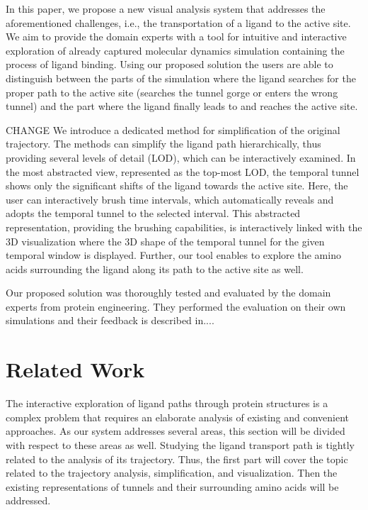 \documentclass[twocolumn]{bmcart}%
\begin{document}
In this paper, we propose a new visual analysis system that addresses the aforementioned challenges, i.e.,  the transportation of a ligand to the active site. 
We aim to provide the domain experts with a tool for intuitive and interactive exploration of already captured molecular dynamics simulation containing the process of ligand binding. 
Using our proposed solution the users are able to distinguish between the parts of the simulation where the ligand searches for the proper path to the active site (searches the tunnel gorge or enters the wrong tunnel) and the part where the ligand finally leads to and reaches the active site.

{\color{red} CHANGE
We introduce a dedicated method for simplification of the original trajectory.
The methods can simplify the ligand path hierarchically, thus providing several levels of detail (LOD), which can be interactively examined.
In the most abstracted view, represented as the top-most LOD, the temporal tunnel shows only the significant shifts of the ligand towards the active site. 
Here, the user can interactively brush time intervals, which automatically reveals and adopts the temporal tunnel to the selected interval.
This abstracted representation, providing the brushing capabilities, is interactively linked with the 3D visualization where the 3D shape of the temporal tunnel for the given temporal window is displayed.
Further, our tool enables to explore the amino acids surrounding the ligand along its path to the active site as well.

Our proposed solution was thoroughly tested and evaluated by the domain experts from protein engineering.
They performed the evaluation on their own simulations and their feedback is described in....}

\section{Related Work}
The interactive exploration of ligand paths through protein structures is a complex problem that requires an elaborate analysis of existing and convenient approaches.
As our system addresses several areas, this section will be divided with respect to these areas as well. 
Studying the ligand transport path is tightly related to the analysis of its trajectory.
Thus, the first part will cover the topic related to the trajectory analysis, simplification, and visualization.
Then the existing representations of tunnels and their surrounding amino acids will be addressed.
\end{document}
